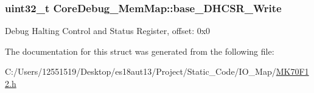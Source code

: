 \subsubsection[{base\+\_\+\+D\+H\+C\+S\+R\+\_\+\+Write}]{\setlength{\rightskip}{0pt plus 5cm}uint32\+\_\+t Core\+Debug\+\_\+\+Mem\+Map\+::base\+\_\+\+D\+H\+C\+S\+R\+\_\+\+Write}\label{struct_core_debug___mem_map_a57de52c8c1eb5789546543f2408ce487}
Debug Halting Control and Status Register, offset\+: 0x0 

The documentation for this struct was generated from the following file\+:\begin{DoxyCompactItemize}
\item 
C\+:/\+Users/12551519/\+Desktop/es18aut13/\+Project/\+Static\+\_\+\+Code/\+I\+O\+\_\+\+Map/\hyperlink{_m_k70_f12_8h}{M\+K70\+F12.\+h}\end{DoxyCompactItemize}
